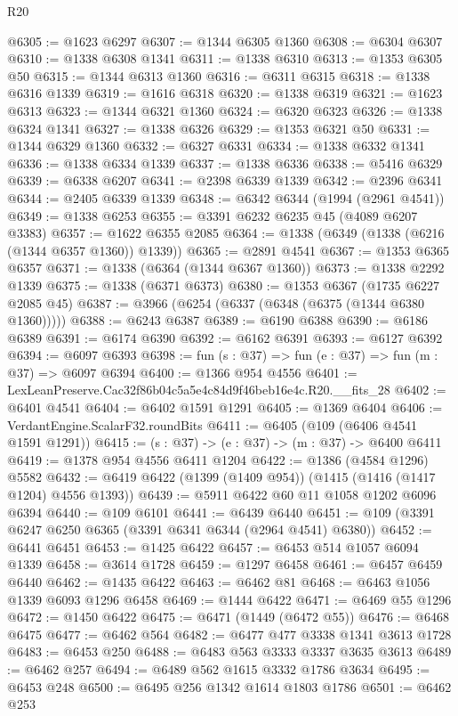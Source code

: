 \begin{lexlean}{R20}
\begin{coremodule}
@6305 := @1623 @6297
@6307 := @1344 @6305 @1360
@6308 := @6304 @6307
@6310 := @1338 @6308 @1341
@6311 := @1338 @6310
@6313 := @1353 @6305 @50
@6315 := @1344 @6313 @1360
@6316 := @6311 @6315
@6318 := @1338 @6316 @1339
@6319 := @1616 @6318
@6320 := @1338 @6319
@6321 := @1623 @6313
@6323 := @1344 @6321 @1360
@6324 := @6320 @6323
@6326 := @1338 @6324 @1341
@6327 := @1338 @6326
@6329 := @1353 @6321 @50
@6331 := @1344 @6329 @1360
@6332 := @6327 @6331
@6334 := @1338 @6332 @1341
@6336 := @1338 @6334 @1339
@6337 := @1338 @6336
@6338 := @5416 @6329
@6339 := @6338 @6207
@6341 := @2398 @6339 @1339
@6342 := @2396 @6341
@6344 := @2405 @6339 @1339
@6348 := @6342 @6344 (@1994 (@2961 @4541))
@6349 := @1338 @6253
@6355 := @3391 @6232 @6235 @45 (@4089 @6207 @3383)
@6357 := @1622 @6355 @2085
@6364 := @1338 (@6349 (@1338 (@6216 (@1344 @6357 @1360)) @1339))
@6365 := @2891 @4541
@6367 := @1353 @6365 @6357
@6371 := @1338 (@6364 (@1344 @6367 @1360))
@6373 := @1338 @2292 @1339
@6375 := @1338 (@6371 @6373)
@6380 := @1353 @6367 (@1735 @6227 @2085 @45)
@6387 := @3966 (@6254 (@6337 (@6348 (@6375 (@1344 @6380 @1360)))))
@6388 := @6243 @6387
@6389 := @6190 @6388
@6390 := @6186 @6389
@6391 := @6174 @6390
@6392 := @6162 @6391
@6393 := @6127 @6392
@6394 := @6097 @6393
@6398 := fun (s : @37) => fun (e : @37) => fun (m : @37) => @6097 @6394
@6400 := @1366 @954 @4556
@6401 := LexLeanPreserve.Cac32f86b04c5a5e4c84d9f46beb16e4c.R20.__fits_28
@6402 := @6401 @4541
@6404 := @6402 @1591 @1291
@6405 := @1369 @6404
@6406 := VerdantEngine.ScalarF32.roundBits
@6411 := @6405 (@109 (@6406 @4541 @1591 @1291))
@6415 := (s : @37) -> (e : @37) -> (m : @37) -> @6400 @6411
@6419 := @1378 @954 @4556 @6411 @1204
@6422 := @1386 (@4584 @1296) @5582
@6432 := @6419 @6422 (@1399 (@1409 @954)) (@1415 (@1416 (@1417 @1204) @4556 @1393))
@6439 := @5911 @6422 @60 @11 @1058 @1202 @6096 @6394
@6440 := @109 @6101
@6441 := @6439 @6440
@6451 := @109 (@3391 @6247 @6250 @6365 (@3391 @6341 @6344 (@2964 @4541) @6380))
@6452 := @6441 @6451
@6453 := @1425 @6422
@6457 := @6453 @514 @1057 @6094 @1339
@6458 := @3614 @1728
@6459 := @1297 @6458
@6461 := @6457 @6459 @6440
@6462 := @1435 @6422
@6463 := @6462 @81
@6468 := @6463 @1056 @1339 @6093 @1296 @6458
@6469 := @1444 @6422
@6471 := @6469 @55 @1296
@6472 := @1450 @6422
@6475 := @6471 (@1449 (@6472 @55))
@6476 := @6468 @6475
@6477 := @6462 @564
@6482 := @6477 @477 @3338 @1341 @3613 @1728
@6483 := @6453 @250
@6488 := @6483 @563 @3333 @3337 @3635 @3613
@6489 := @6462 @257
@6494 := @6489 @562 @1615 @3332 @1786 @3634
@6495 := @6453 @248
@6500 := @6495 @256 @1342 @1614 @1803 @1786
@6501 := @6462 @253

\end{coremodule}
\end{lexlean}
